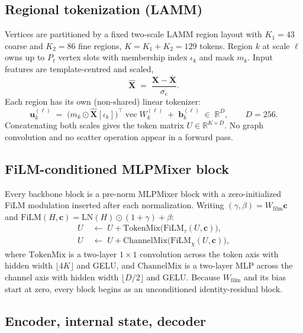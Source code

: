 \documentclass[11pt]{article}
\newcommand{\R}{\mathbb{R}}
\newcommand{\X}{\bm{X}}
\newcommand{\cond}{\bm{c}}
\begin{document}
\subsection{Regional tokenization (LAMM)}

Vertices are partitioned by a fixed two-scale LAMM region layout with
$K_1 = 43$ coarse and $K_2 = 86$ fine regions, $K = K_1 + K_2 = 129$ tokens. Region $k$ at
scale $\ell$ owns up to $P_\ell$ vertex slots with membership index $\iota_k$ and mask
$m_k$. Input features are template-centred and scaled,
\begin{equation}
  \widehat{\X} \;=\; \frac{\X - \overline{\X}}{\sigma_{\mathrm{c}}} .
\end{equation}
Each region has its own (non-shared) linear tokenizer:
\begin{equation}
  \bm{u}^{(\ell)}_k \;=\; \bigl( m_k \odot \widehat{\X}[\iota_k] \bigr)^{\!\top}
  \! \operatorname{vec} W^{(\ell)}_k \;+\; \bm{b}^{(\ell)}_k \;\in\; \R^{D},
  \qquad D = 256 .
\end{equation}
Concatenating both scales gives the token matrix $U \in \R^{K \times D}$. No graph
convolution and no scatter operation appear in a forward pass.

\subsection{FiLM-conditioned MLPMixer block}

Every backbone block is a pre-norm MLPMixer block with a zero-initialized FiLM modulation
inserted after each normalization. Writing $(\gamma, \beta) = W_{\mathrm{film}} \cond$ and
$\mathrm{FiLM}(H,\cond) = \mathrm{LN}(H) \odot (1 + \gamma) + \beta$:
\begin{align}
  U &\;\leftarrow\; U + \mathrm{TokenMix}\bigl( \mathrm{FiLM}_{\tau}(U, \cond) \bigr), \\
  U &\;\leftarrow\; U + \mathrm{ChannelMix}\bigl( \mathrm{FiLM}_{\chi}(U, \cond) \bigr),
\end{align}
where $\mathrm{TokenMix}$ is a two-layer $1{\times}1$ convolution across the token axis with
hidden width $\lfloor 4K \rfloor$ and GELU, and $\mathrm{ChannelMix}$ is a two-layer MLP
across the channel axis with hidden width $\lfloor D/2 \rfloor$ and GELU. Because
$W_{\mathrm{film}}$ and its bias start at zero, every block begins as an unconditioned
identity-residual block.

\subsection{Encoder, internal state, decoder}
\end{document}
